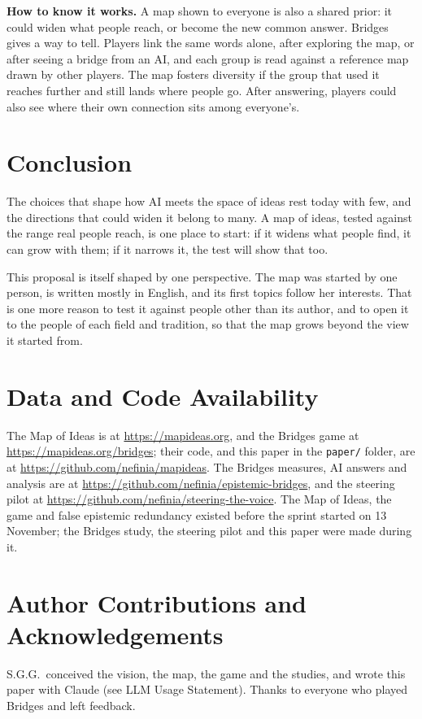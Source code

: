 \documentclass[11pt]{article}
\begin{document}
\textbf{How to know it works.} A map shown to everyone is also a shared prior: it could widen what people reach, or become the new common answer. Bridges gives a way to tell. Players link the same words alone, after exploring the map, or after seeing a bridge from an AI, and each group is read against a reference map drawn by other players. The map fosters diversity if the group that used it reaches further and still lands where people go. After answering, players could also see where their own connection sits among everyone's.

\section{Conclusion}

The choices that shape how AI meets the space of ideas rest today with few, and the directions that could widen it belong to many. A map of ideas, tested against the range real people reach, is one place to start: if it widens what people find, it can grow with them; if it narrows it, the test will show that too.

This proposal is itself shaped by one perspective. The map was started by one person, is written mostly in English, and its first topics follow her interests. That is one more reason to test it against people other than its author, and to open it to the people of each field and tradition, so that the map grows beyond the view it started from.

\section*{Data and Code Availability}
The Map of Ideas is at \url{https://mapideas.org}, and the Bridges game at \url{https://mapideas.org/bridges}; their code, and this paper in the \texttt{paper/} folder, are at \url{https://github.com/nefinia/mapideas}. The Bridges measures, AI answers and analysis are at \url{https://github.com/nefinia/epistemic-bridges}, and the steering pilot at \url{https://github.com/nefinia/steering-the-voice}. The Map of Ideas, the game and false epistemic redundancy existed before the sprint started on 13 November; the Bridges study, the steering pilot and this paper were made during it.

\section*{Author Contributions and Acknowledgements}
S.G.G.\ conceived the vision, the map, the game and the studies, and wrote this paper with Claude (see LLM Usage Statement). Thanks to everyone who played Bridges and left feedback.
\end{document}
